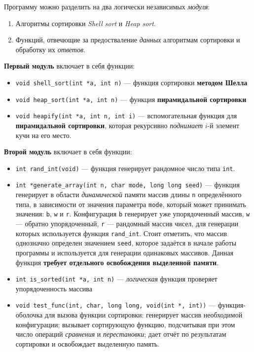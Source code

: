 \documentclass[a4paper,12pt,titlepage,finall]{article}
\begin{document}
Программу можно разделить на два логически независимых \textit{модуля}:
\begin{enumerate}
\item
Алгоритмы сортировки \textit{Shell sort} и \textit{Heap sort}.

\item
Функций, отвечющие за предостваление \textit{данных} алгоритмам сортировки и обработку их \textit{ответов}.
\end{enumerate}

\textbf{Первый модуль} включает в себя функции:

\begin{itemize}
\item
\texttt{void shell\_sort(int *a, int n)} — функция сортировки \textbf{методом Шелла}

\item
\texttt{void heap\_sort(int *a, int n)} — функция \textbf{пирамидальной сортировки}

\item
\texttt{void heapify(int *a, int n, int i)} — вспомогательная функция для \textbf{пирамидальной сортировки}, которая рекурсивно \textit{поднимает} $i$-й элемент кучи на его место. 
\end{itemize}

\textbf{Второй модуль} включает в себя функции:

\begin{itemize}
\item
\texttt{int rand\_int(void)} — функция генерирует рандомное число типа \texttt{int}.

\item
\texttt{int *generate\_array(int n, char mode, long long seed)} — функция генерирует в области \textit{динамической} памяти массив длины \texttt{n} определённого типа, в зависимости от значения параметра \texttt{mode}, который может принимать значения: \texttt{b}, \texttt{w} и \texttt{r}. Конфигурация \texttt{b} генерирует уже упорядоченный массив, \texttt{w} — обратно упорядоченный, \texttt{r} — рандомный массив чисел, для генерации которых используется функция \texttt{rand\_int}. Стоит отметить, что массив однозначно определен значением \texttt{seed}, которое задаётся в начале работы программы и используется для генерации одинаковых массивов. Данная функция \textbf{требует отдельного освобождения выделенной памяти}.

\item
\texttt{int is\_sorted(int *a, int n)} — \textit{логическая} функция проверяет упорядоченность массива

\item
\texttt{void test\_func(int, char, long long, void(int *, int))} — функция-оболочка для вызова функции сортировки: генерирует массив необходимой конфигурации; вызывает сортирующую функцию, подсчитывая при этом число операций \textit{сравнения} и \textit{перестановки}; дает отчёт по результатам сортировки и освобождает выделенную память.
\end{itemize}
\end{document}
